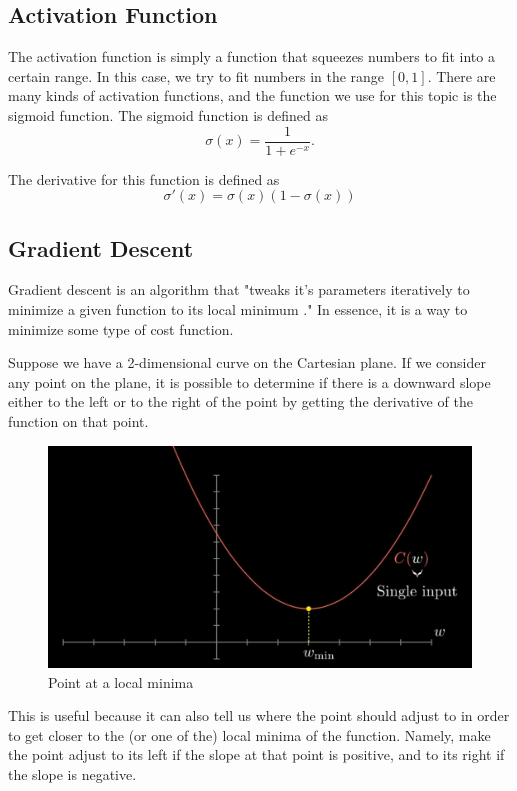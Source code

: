 \documentclass[a4paper, 11pt, english]{article}
\begin{document}
\subsection{Activation Function}
\par The activation function is simply a function that squeezes numbers to fit into a certain range. In this case, we try to fit numbers in the range $[0,1]$. There are many kinds of activation functions, and the function we use for this topic is the sigmoid function. The sigmoid function is defined as
\[\sigma(x) = \frac{1}{1+e^{-x}}.\]

\par The derivative for this function is defined as
\[\sigma'(x) = \sigma(x)\left(1 - \sigma(x)\right)\]

\subsection{Gradient Descent}
\par Gradient descent is an algorithm that "tweaks it's parameters iteratively to minimize a given function to its local minimum \cite{donges_2018}." In essence, it is a way to minimize some type of cost function.
\par Suppose we have a 2-dimensional curve on the Cartesian plane. If we consider any point on the plane, it is possible to determine if there is a downward slope either to the left or to the right of the point by getting the derivative of the function on that point.

\begin{figure}[H]
  \centering
  \includegraphics[width=12cm]{images/gd1.jpg}
  \caption{Point at a local minima\cite{3blue1brown_2017_2}}
  \label{fig:gd1}
\end{figure}

\par This is useful because it can also tell us where the point should adjust to in order to get closer to the (or one of the) local minima of the function. Namely, make the point adjust to its left if the slope at that point is positive, and to its right if the slope is negative.
\end{document}
